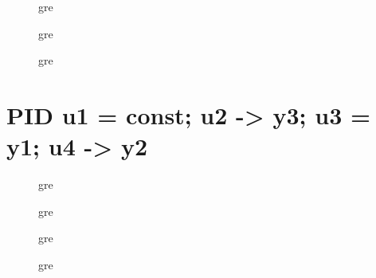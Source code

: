 \begin{figure}[H]
    \centering
    
    \caption{gre}
\end{figure}

\begin{figure}[H]
    \centering
    
    \caption{gre}
\end{figure}

\begin{figure}[H]
    \centering
    
    \caption{gre}
\end{figure}

\section{PID u1 = const; u2 -> y3; u3 = y1; u4 -> y2}

\begin{figure}[H]
    \centering
    
    \caption{gre}
\end{figure}


\begin{figure}[H]
    \centering
    
    \caption{gre}
\end{figure}


\begin{figure}[H]
    \centering
    
    \caption{gre}
\end{figure}


\begin{figure}[H]
    \centering
    
    \caption{gre}
\end{figure}


